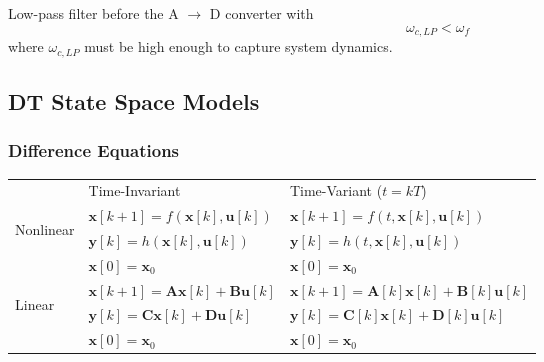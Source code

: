 
Low-pass filter before the A $\rightarrow$ D converter with
\begin{equation*}
    \omega_{c,LP} < \omega_f
\end{equation*}
where $\omega_{c,LP}$ must be high enough to capture system dynamics.

\subsection{DT State Space Models}
\subsubsection{Difference Equations}

\renewcommand{\arraystretch}{1.3}
\setlength{\oldtabcolsep}{\tabcolsep}\setlength\tabcolsep{3pt}

\begin{tabularx}{\linewidth}{@{}lll@{}}
                                                             & Time-Invariant                                     & Time-Variant ($t = kT$)                                                   \\
    \cmidrule{2-3}
    \multirow{3}{*}{\begin{sideways}Nonlinear\end{sideways}} & $\mathbf{x}[k+1] = f(\mathbf{x}[k],\mathbf{u}[k])$ & $\mathbf{x}[k+1] = f(t,\mathbf{x}[k],\mathbf{u}[k])$                      \\
                                                             & $\mathbf{y}[k] = h(\mathbf{x}[k],\mathbf{u}[k])$   & $\mathbf{y}[k] = h(t,\mathbf{x}[k],\mathbf{u}[k])$                        \\
                                                             & $\mathbf{x}[0]=\mathbf{x}_0$                       & $\mathbf{x}[0]=\mathbf{x}_0$                                              \\
    \cmidrule{2-3}
    \multirow{3}{*}{\begin{sideways}Linear\end{sideways}}    & $\mathbf{x}[k+1] = \mathbf{Ax}[k]+\mathbf{Bu}[k]$  & $\mathbf{x}[k+1] = \mathbf{A}[k]\mathbf{x}[k]+\mathbf{B}[k]\mathbf{u}[k]$ \\
                                                             & $\mathbf{y}[k] = \mathbf{Cx}[k]+\mathbf{Du}[k]$    & $\mathbf{y}[k] = \mathbf{C}[k]\mathbf{x}[k]+\mathbf{D}[k]\mathbf{u}[k]$   \\
                                                             & $\mathbf{x}[0] = \mathbf{x}_0$                     & $\mathbf{x}[0]=\mathbf{x}_0$
\end{tabularx}

